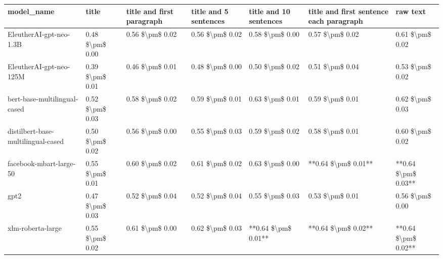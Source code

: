 \begin{tabular}{lllllll}
\toprule
                        model\_name &           title & title and first paragraph & title and 5 sentences & title and 10 sentences & title and first sentence each paragraph &            raw text \\
\midrule
           EleutherAI-gpt-neo-1.3B & 0.48 \$\textbackslash pm\$ 0.00 &           0.56 \$\textbackslash pm\$ 0.02 &       0.56 \$\textbackslash pm\$ 0.02 &        0.58 \$\textbackslash pm\$ 0.00 &                         0.57 \$\textbackslash pm\$ 0.02 &     0.61 \$\textbackslash pm\$ 0.02 \\
           EleutherAI-gpt-neo-125M & 0.39 \$\textbackslash pm\$ 0.01 &           0.46 \$\textbackslash pm\$ 0.01 &       0.48 \$\textbackslash pm\$ 0.00 &        0.50 \$\textbackslash pm\$ 0.02 &                         0.51 \$\textbackslash pm\$ 0.04 &     0.53 \$\textbackslash pm\$ 0.02 \\
      bert-base-multilingual-cased & 0.52 \$\textbackslash pm\$ 0.03 &           0.58 \$\textbackslash pm\$ 0.02 &       0.59 \$\textbackslash pm\$ 0.01 &        0.63 \$\textbackslash pm\$ 0.01 &                         0.59 \$\textbackslash pm\$ 0.01 &     0.62 \$\textbackslash pm\$ 0.03 \\
distilbert-base-multilingual-cased & 0.50 \$\textbackslash pm\$ 0.02 &           0.56 \$\textbackslash pm\$ 0.00 &       0.55 \$\textbackslash pm\$ 0.03 &        0.59 \$\textbackslash pm\$ 0.02 &                         0.58 \$\textbackslash pm\$ 0.01 &     0.60 \$\textbackslash pm\$ 0.02 \\
           facebook-mbart-large-50 & 0.55 \$\textbackslash pm\$ 0.01 &           0.60 \$\textbackslash pm\$ 0.02 &       0.61 \$\textbackslash pm\$ 0.02 &        0.63 \$\textbackslash pm\$ 0.00 &                     **0.64 \$\textbackslash pm\$ 0.01** & **0.64 \$\textbackslash pm\$ 0.03** \\
                              gpt2 & 0.47 \$\textbackslash pm\$ 0.03 &           0.52 \$\textbackslash pm\$ 0.04 &       0.52 \$\textbackslash pm\$ 0.04 &        0.55 \$\textbackslash pm\$ 0.03 &                         0.53 \$\textbackslash pm\$ 0.01 &     0.56 \$\textbackslash pm\$ 0.00 \\
                 xlm-roberta-large & 0.55 \$\textbackslash pm\$ 0.02 &           0.61 \$\textbackslash pm\$ 0.00 &       0.62 \$\textbackslash pm\$ 0.03 &    **0.64 \$\textbackslash pm\$ 0.01** &                     **0.64 \$\textbackslash pm\$ 0.02** & **0.64 \$\textbackslash pm\$ 0.02** \\
\bottomrule
\end{tabular}
